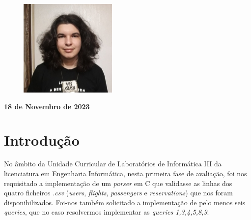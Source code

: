 \documentclass[11pt]{article}
\begin{document}
\begin{titlepage}
\begin{center}
\begin{figure}[hbt!]
            \centering
            \captionsetup{A95454}
        \endminipage\hfill        
            \includegraphics[width=\linewidth]{Imagens/slash.png}
            \centering
            \captionsetup{A97321}
        \endminipage
        \end{figure}
        
        \vspace{3cm}
        \textbf{18 de Novembro de 2023}
    \end{center}
    

\end{titlepage}


\thispagestyle{empty}
\cleardoublepage
\tableofcontents 
\clearpage


\section {Introdução}
    No âmbito da Unidade Curricular de Laboratórios de Informática III da licenciatura em Engenharia Informática, nesta primeira fase de avaliação, foi nos requisitado a implementação de um \textit{parser} em C que validasse as linhas dos quatro ficheiros \textit{.csv} (\textit{users}, \textit{flights}, \textit{passengers} e \textit{reservations}) que nos foram disponibilizados.
    Foi-nos também solicitado a implementação de pelo menos seis \textit{queries}, que no caso resolvermos implementar as \textit{queries 1,3,4,5,8,9}.
    
\end{document}
